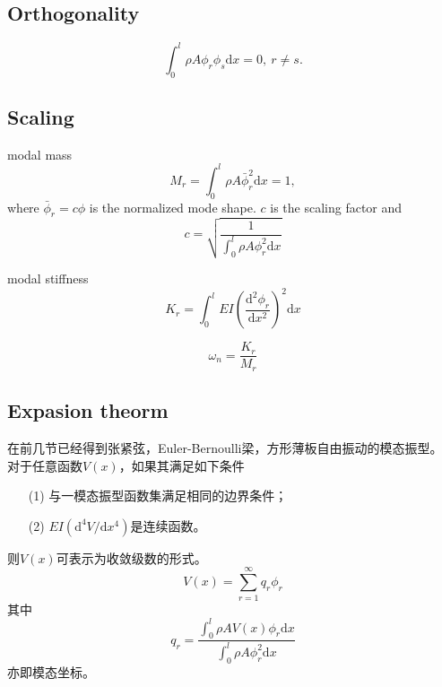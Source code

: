 \subsection{Orthogonality}

\begin{equation}
    \int_{0}^{l}\rho A\phi_{r}\phi_{s}\mathrm{d}x=0,\ r\neq s.
\end{equation}

\subsection{Scaling}

modal mass
\begin{equation}\label{eq-1::model-mass}
    M_{r}=\int_{0}^{l}\rho A\bar{\phi}_{r}^{2}\mathrm{d}x=1,
\end{equation}
where $\bar{\phi}_{r}=c\phi$ is the normalized mode shape. $c$ is the scaling factor and 
\begin{equation}
    c=\sqrt{\frac{1}{\int_{0}^{l}\rho A\phi_{r}^{2}\mathrm{d}x}}
\end{equation}

modal stiffness
\begin{equation}\label{eq-1::modal-stiffness}
    K_{r}=\int_{0}^{l}EI\left(\frac{\mathrm{d}^{2}\phi_{r}}{\mathrm{d}x^{2}}\right)^{2}\mathrm{d}x
\end{equation}

\begin{equation}\label{eq-1::relation-mass-stiffness}
    \omega_{n}=\frac{K_{r}}{M_{r}}
\end{equation}

\subsection{Expasion theorm}

在前几节已经得到张紧弦，Euler-Bernoulli梁，方形薄板自由振动的模态振型。
对于任意函数$V(x)$，如果其满足如下条件
\begin{enumerate}
    \item[(1)] 与一模态振型函数集满足相同的边界条件；
    \item[(2)] $EI\left(\mathrm{d}^{4}V/\mathrm{d}x^{4}\right)$是连续函数。
\end{enumerate}
则$V(x)$可表示为收敛级数的形式。
\begin{equation}\label{eq-1::expansion}
    V(x)=\sum_{r=1}^{\infty}q_{r}\phi_{r}
\end{equation}
其中
\begin{equation}
    q_{r}=\frac{\int_{0}^{l}\rho AV(x)\phi_{r}\mathrm{d}x}{\int_{0}^{l}\rho A\phi_{r}^{2}\mathrm{d}x}
\end{equation}
亦即模态坐标。

